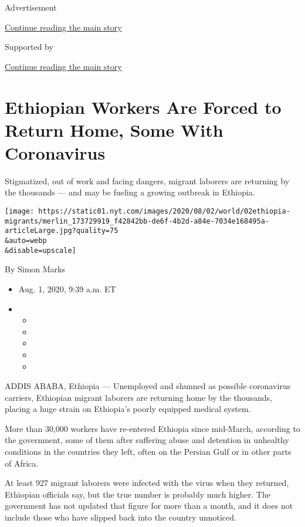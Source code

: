 Advertisement

\protect\hyperlink{after-top}{Continue reading the main story}

Supported by

\protect\hyperlink{after-sponsor}{Continue reading the main story}

\hypertarget{ethiopian-workers-are-forced-to-return-home-some-with-coronavirus}{%
\section{Ethiopian Workers Are Forced to Return Home, Some With
Coronavirus}\label{ethiopian-workers-are-forced-to-return-home-some-with-coronavirus}}

Stigmatized, out of work and facing dangers, migrant laborers are
returning by the thousands --- and may be fueling a growing outbreak in
Ethiopia.

\texttt{[image: https://static01.nyt.com/images/2020/08/02/world/02ethiopia-migrants/merlin\_173729919\_f42842bb-de6f-4b2d-a84e-7034e168495a-articleLarge.jpg?quality=75\\\&auto=webp\\\&disable=upscale]}

By Simon Marks

\begin{itemize}
\item
  Aug. 1, 2020, 9:39 a.m. ET
\item
  \begin{itemize}
  \item
  \item
  \item
  \item
  \item
  \end{itemize}
\end{itemize}

ADDIS ABABA, Ethiopia --- Unemployed and shunned as possible coronavirus
carriers, Ethiopian migrant laborers are returning home by the
thousands, placing a huge strain on Ethiopia's poorly equipped medical
system.

More than 30,000 workers have re-entered Ethiopia since mid-March,
according to the government, some of them after suffering abuse and
detention in unhealthy conditions in the countries they left, often on
the Persian Gulf or in other parts of Africa.

At least 927 migrant laborers were infected with the virus when they
returned, Ethiopian officials say, but the true number is probably much
higher. The government has not updated that figure for more than a
month, and it does not include those who have slipped back into the
country unnoticed.

